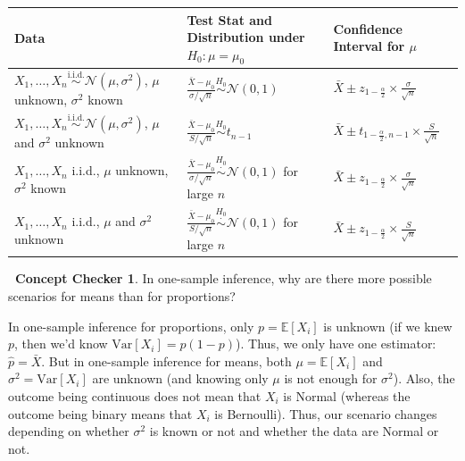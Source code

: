 \documentclass[12pt,oneside]{article}
\newcommand{\E}{\mathbb{E}}
\newcommand{\Var}{\text{Var}}
\newcommand{\N}{\mathcal{N}}
\newcommand{\simiid}{\overset{\text{i.i.d.}}{\sim}}
\newcommand{\simnull}{\overset{H_0}{\sim}}
\newcommand{\simapprox}{\overset{\cdot}{\sim}}
\newcommand{\simnullapprox}{\overset{H_0}{\simapprox}}
\theoremstyle{definition}
\newtheorem{concept}{\faPen \ Concept Checker}
\theoremstyle{remark}
\begin{document}
\begin{center}
\renewcommand{\arraystretch}{1.5}
\begin{tabular}{p{6cm}|p{5cm}|p{5cm}}
\textbf{Data} & 
\textbf{Test Stat and Distribution under $H_0: \mu = \mu_0$} & 
\textbf{Confidence Interval for $\mu$} \\ \hline

$X_1, \ldots, X_n \simiid \N(\mu, \sigma^2)$, $\mu$ unknown, $\sigma^2$ known
& $\frac{\bar{X} - \mu_0}{\sigma / \sqrt{n}} \simnull \N(0, 1)$
& $\bar{X} \pm z_{1 - \frac{\alpha}{2}} \times \frac{\sigma}{\sqrt{n}}$ \\

\hline

$X_1, \ldots, X_n \simiid \N(\mu, \sigma^2)$, $\mu$ and $\sigma^2$ unknown
& $\frac{\bar{X} - \mu_0}{S / \sqrt{n}} \simnull t_{n - 1}$
& $\bar{X} \pm t_{1 - \frac{\alpha}{2}, n - 1} \times \frac{S}{\sqrt{n}}$ \\

\hline

$X_1, \ldots, X_n$ i.i.d., $\mu$ unknown, $\sigma^2$ known
& $\frac{\bar{X} - \mu_0}{\sigma / \sqrt{n}} \simnullapprox \N(0, 1)$ for large $n$
& $\bar{X} \pm z_{1 - \frac{\alpha}{2}} \times \frac{\sigma}{\sqrt{n}}$ \\

\hline

$X_1, \ldots, X_n$ i.i.d., $\mu$ and $\sigma^2$ unknown
& $\frac{\bar{X} - \mu_0}{S / \sqrt{n}} \simnullapprox \N(0, 1)$ for large $n$
& $\bar{X} \pm z_{1 - \frac{\alpha}{2}} \times \frac{S}{\sqrt{n}}$
\end{tabular}
\end{center}

\begin{concept}
In one-sample inference, why are there more possible scenarios for means than for proportions?
\end{concept}

\begin{solutionbox}
In one-sample inference for proportions, only $p = \E[X_i]$ is unknown (if we knew $p$, then we'd know $\Var[X_i] = p(1 - p)$). Thus, we only have one estimator: $\hat{p} = \bar{X}$. But in one-sample inference for means, both $\mu = \E[X_i]$ and $\sigma^2 = \Var[X_i]$ are unknown (and knowing only $\mu$ is not enough for $\sigma^2$). Also, the outcome being continuous does not mean that $X_i$ is Normal (whereas the outcome being binary means that $X_i$ is Bernoulli). Thus, our scenario changes depending on whether $\sigma^2$ is known or not and whether the data are Normal or not.
\end{solutionbox}
\end{document}
